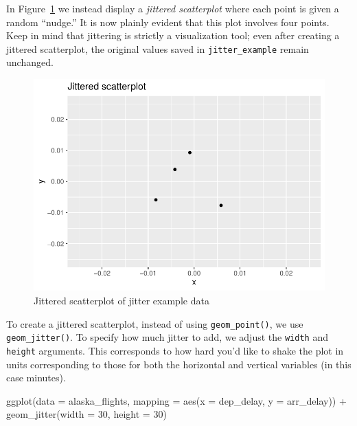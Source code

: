 \documentclass[
  letterpaper,
  DIV=11,
  numbers=noendperiod]{scrreprt}
\newenvironment{Shaded}{\begin{snugshade}}{\end{snugshade}}
\newcommand{\AttributeTok}[1]{\textcolor[rgb]{0.40,0.45,0.13}{#1}}
\newcommand{\DecValTok}[1]{\textcolor[rgb]{0.68,0.00,0.00}{#1}}
\newcommand{\FunctionTok}[1]{\textcolor[rgb]{0.28,0.35,0.67}{#1}}
\newcommand{\NormalTok}[1]{\textcolor[rgb]{0.00,0.23,0.31}{#1}}
\newcommand{\SpecialCharTok}[1]{\textcolor[rgb]{0.37,0.37,0.37}{#1}}
\theoremstyle{definition}
\theoremstyle{remark}
\begin{document}
In Figure~\ref{fig-jitter-example-plot-2} we instead display a
\emph{jittered scatterplot} where each point is given a random
``nudge.'' It is now plainly evident that this plot involves four
points. Keep in mind that jittering is strictly a visualization tool;
even after creating a jittered scatterplot, the original values saved in
\texttt{jitter\_example} remain unchanged.

\begin{figure}

{\centering \includegraphics{02-visualization_files/figure-pdf/fig-jitter-example-plot-2-1.pdf}

}

\caption{\label{fig-jitter-example-plot-2}Jittered scatterplot of jitter
example data}

\end{figure}

To create a jittered scatterplot, instead of using
\texttt{geom\_point()}, we use \texttt{geom\_jitter()}. To specify how
much jitter to add, we adjust the \texttt{width} and \texttt{height}
arguments. This corresponds to how hard you'd like to shake the plot in
units corresponding to those for both the horizontal and vertical
variables (in this case minutes).

\begin{Shaded}
\begin{Highlighting}[]
\FunctionTok{ggplot}\NormalTok{(}\AttributeTok{data =}\NormalTok{ alaska\_flights, }\AttributeTok{mapping =} \FunctionTok{aes}\NormalTok{(}\AttributeTok{x =}\NormalTok{ dep\_delay, }\AttributeTok{y =}\NormalTok{ arr\_delay)) }\SpecialCharTok{+} 
  \FunctionTok{geom\_jitter}\NormalTok{(}\AttributeTok{width =} \DecValTok{30}\NormalTok{, }\AttributeTok{height =} \DecValTok{30}\NormalTok{)}
\end{Highlighting}
\end{Shaded}
\end{document}
